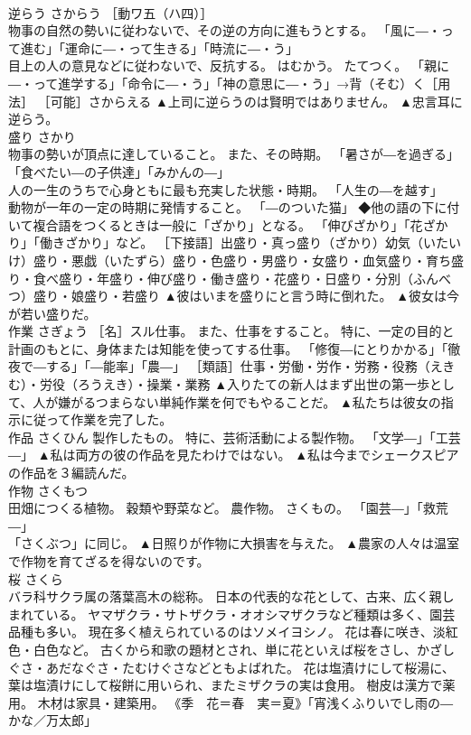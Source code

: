 \documentclass[8pt]{extreport}
\begin{document}
\begin{CJK}{UTF8}{min}
\\	逆らう	さからう	［動ワ五（ハ四）］ 
\\	物事の自然の勢いに従わないで、その逆の方向に進もうとする。 「風に―・って進む」「運命に―・って生きる」「時流に―・う」 
\\	目上の人の意見などに従わないで、反抗する。 はむかう。 たてつく。 「親に―・って進学する」「命令に―・う」「神の意思に―・う」→背（そむ）く［用法］ ［可能］さからえる	▲上司に逆らうのは賢明ではありません。 ▲忠言耳に逆らう。
\\	盛り	さかり	
\\	物事の勢いが頂点に達していること。 また、その時期。 「暑さが―を過ぎる」「食べたい―の子供達」「みかんの―」 
\\	人の一生のうちで心身ともに最も充実した状態・時期。 「人生の―を越す」 
\\	動物が一年の一定の時期に発情すること。 「―のついた猫」 ◆他の語の下に付いて複合語をつくるときは一般に「ざかり」となる。 「伸びざかり」「花ざかり」「働きざかり」など。 ［下接語］出盛り・真っ盛り（ざかり）幼気（いたいけ）盛り・悪戯（いたずら）盛り・色盛り・男盛り・女盛り・血気盛り・育ち盛り・食べ盛り・年盛り・伸び盛り・働き盛り・花盛り・日盛り・分別（ふんべつ）盛り・娘盛り・若盛り	▲彼はいまを盛りにと言う時に倒れた。 ▲彼女は今が若い盛りだ。
\\	作業	さぎょう	［名］スル仕事。 また、仕事をすること。 特に、一定の目的と計画のもとに、身体または知能を使ってする仕事。 「修復―にとりかかる」「徹夜で―する」「―能率」「農―」 ［類語］仕事・労働・労作・労務・役務（えきむ）・労役（ろうえき）・操業・業務	▲入りたての新人はまず出世の第一歩として、人が嫌がるつまらない単純作業を何でもやることだ。 ▲私たちは彼女の指示に従って作業を完了した。
\\	作品	さくひん	製作したもの。 特に、芸術活動による製作物。 「文学―」「工芸―」	▲私は両方の彼の作品を見たわけではない。 ▲私は今までシェークスピアの作品を３編読んだ。
\\	作物	さくもつ	
\\	田畑につくる植物。 穀類や野菜など。 農作物。 さくもの。 「園芸―」「救荒―」 
\\	「さくぶつ」に同じ。	▲日照りが作物に大損害を与えた。 ▲農家の人々は温室で作物を育てざるを得ないのです。
\\	桜	さくら	
\\	バラ科サクラ属の落葉高木の総称。 日本の代表的な花として、古来、広く親しまれている。 ヤマザクラ・サトザクラ・オオシマザクラなど種類は多く、園芸品種も多い。 現在多く植えられているのはソメイヨシノ。 花は春に咲き、淡紅色・白色など。 古くから和歌の題材とされ、単に花といえば桜をさし、かざしぐさ・あだなぐさ・たむけぐさなどともよばれた。 花は塩漬けにして桜湯に、葉は塩漬けにして桜餅に用いられ、またミザクラの実は食用。 樹皮は漢方で薬用。 木材は家具・建築用。 《季　花＝春　実＝夏》「宵浅くふりいでし雨の―かな／万太郎」 

\end{CJK}
\end{document}
